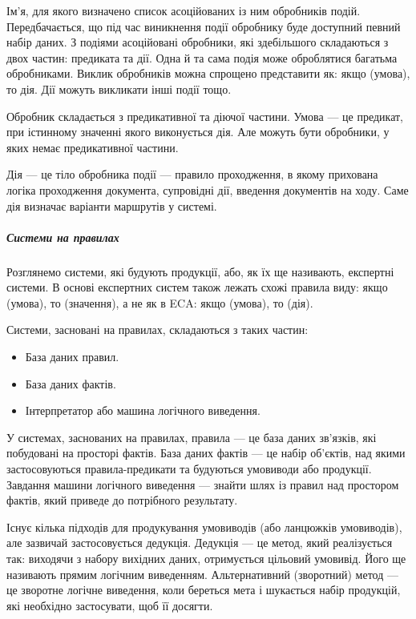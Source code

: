 \documentclass{memoir}
\begin{document}
Ім’я, для якого визначено список асоційованих із ним обробників подій. Передбачається, що під час виникнення події обробнику буде доступний певний набір даних. З подіями асоційовані обробники, які здебільшого складаються з двох частин: предиката та дії. Одна й та сама подія може оброблятися багатьма обробниками. Виклик обробників можна спрощено представити як: якщо (умова), то {дія}. Дії можуть викликати інші події тощо.

Обробник складається з предикативної та діючої частини. Умова — це предикат, при істинному значенні якого виконується дія. Але можуть бути обробники, у яких немає предикативної частини.

Дія — це тіло обробника події — правило проходження, в якому прихована логіка проходження документа, супровідні дії, введення документів на ходу. Саме дія визначає варіанти маршрутів у системі.

\subparagraph{Системи на правилах}

Розглянемо системи, які будують продукції, або, як їх ще називають, експертні системи. В основі експертних систем також лежать схожі правила виду: якщо (умова), то (значення), а не як в ECA: якщо (умова), то (дія).

Системи, засновані на правилах, складаються з таких частин:

\begin{itemize}
    \item База даних правил.
    \item База даних фактів.
    \item Інтерпретатор або машина логічного виведення.
\end{itemize}

У системах, заснованих на правилах, правила — це база даних зв’язків, які побудовані на просторі фактів. База даних фактів — це набір об’єктів, над якими застосовуються правила-предикати та будуються умовиводи або продукції. Завдання машини логічного виведення — знайти шлях із правил над простором фактів, який приведе до потрібного результату.

Існує кілька підходів для продукування умовиводів (або ланцюжків умовиводів), але зазвичай застосовується дедукція. Дедукція — це метод, який реалізується так: виходячи з набору вихідних даних, отримується цільовий умовивід. Його ще називають прямим логічним виведенням. Альтернативний (зворотний) метод — це зворотне логічне виведення, коли береться мета і шукається набір продукцій, які необхідно застосувати, щоб її досягти.
\end{document}
